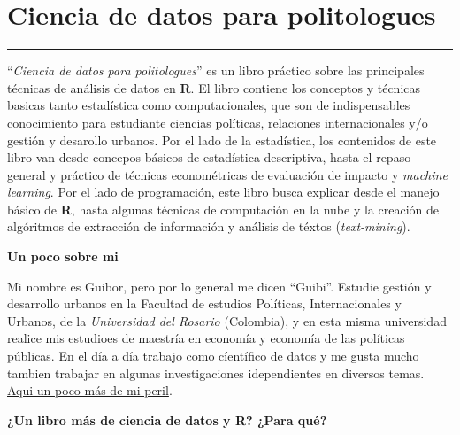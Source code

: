 \documentclass[
]{book}
\author{Guibor Camargo}
\date{2022-08-01}
\begin{document}
{
\setcounter{tocdepth}{1}
\tableofcontents
}
\hypertarget{ciencia-de-datos-para-politologues}{%
\chapter*{\texorpdfstring{\textbf{Ciencia de datos para politologues}}{Ciencia de datos para politologues}}\label{ciencia-de-datos-para-politologues}}

\begin{center}\rule{0.5\linewidth}{0.5pt}\end{center}

``\emph{Ciencia de datos para politologues}'' es un libro práctico sobre las principales técnicas de análisis de datos en \textbf{R}. El libro contiene los conceptos y técnicas basicas tanto estadística como computacionales, que son de indispensables conocimiento para estudiante ciencias políticas, relaciones internacionales y/o gestión y desarollo urbanos. Por el lado de la estadística, los contenidos de este libro van desde concepos básicos de estadística descriptiva, hasta el repaso general y práctico de técnicas econométricas de evaluación de impacto y \emph{machine learning}. Por el lado de programación, este libro busca explicar desde el manejo básico de \textbf{R}, hasta algunas técnicas de computación en la nube y la creación de algóritmos de extracción de información y análisis de téxtos (\emph{text-mining}).

\textbf{Un poco sobre mi}

Mi nombre es Guibor, pero por lo general me dicen ``Guibi''. Estudie gestión y desarrollo urbanos en la Facultad de estudios Políticas, Internacionales y Urbanos, de la \emph{Universidad del Rosario} (Colombia), y en esta misma universidad realice mis estudioes de maestría en economía y economía de las políticas públicas. En el día a día trabajo como cíentífico de datos y me gusta mucho tambien trabajar en algunas investigaciones idependientes en diversos temas. \href{https://www.linkedin.com/in/guibor-camargo-salamanca-69bb1981/}{Aqui un poco más de mi peril}.

\textbf{¿Un libro más de ciencia de datos y R? ¿Para qué?}
\end{document}

